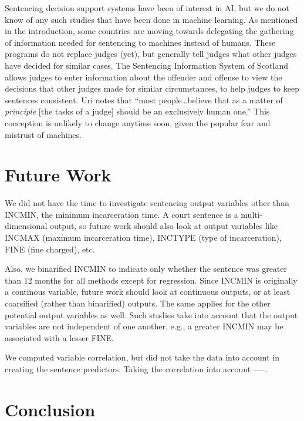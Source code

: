 \documentclass[11pt,letter]{article}
\begin{document}
Sentencing decision support systems have been of interest in AI, but we do not know of any such studies that have been done in machine learning. As mentioned in the introduction, some countries are moving towards delegating the gathering of information needed for sentencing to machines instead of humans. These programs do not replace judges (yet), but generally tell judges what other judges have decided for similar cases. 
The Sentencing Information System of Scotland allows judges to enter information about the offender and offense to view the decisions that other judges made for similar circumstances, to help judges to keep sentences consistent. Uri notes that ``most people\ldots believe that as a matter of \emph{principle} [the tasks of a judge] should be an exclusively human one.'' This conception is unlikely to change anytime soon, given the popular fear and mistrust of machines. 


\section{Future Work}
We did not have the time to investigate sentencing output variables other than INCMIN, the minimum incarceration time. A court sentence is a multi-dimensional output, so future work should also look at output variables like INCMAX (maximum incarceration time), INCTYPE (type of incarceration), FINE (fine charged), etc. 

Also, we binarified INCMIN to indicate only whether the sentence was greater than 12 months for all methods except for regression. Since INCMIN is originally a continous variable, future work should look at continuous outputs, or at least coarsified (rather than binarified) outputs. The same applies for the other potential output variables as well. Such studies take into account that the output variables are not independent of one another. e.g., a greater INCMIN may be associated with a lesser FINE. 

We computed variable correlation, but did not take the data into account in creating the sentence predictors. Taking the correlation into account -----.

\section{Conclusion}
\end{document}
